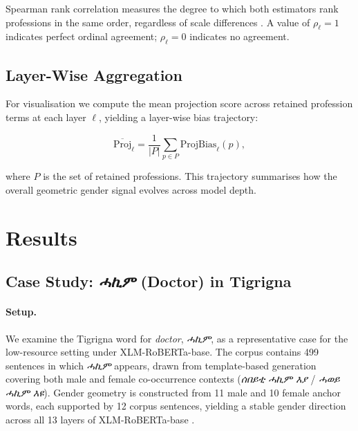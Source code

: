 \documentclass[10pt]{article}
\begin{document}
Spearman rank correlation measures the degree to which both estimators
rank professions in the same order, regardless of scale differences
\citep{spearman1904}. A value of $\rho_{\ell} = 1$ indicates perfect ordinal
agreement; $\rho_{\ell} = 0$ indicates no agreement.

\subsection{Layer-Wise Aggregation}

For visualisation we compute the mean projection score across retained
profession terms at each layer $\ell$, yielding a layer-wise bias trajectory:

\begin{equation}
  \overline{\mathrm{Proj}}_{\ell}
  =
  \frac{1}{|P|}
  \sum_{p \in P}
  \mathrm{ProjBias}_{\ell}(p),
\end{equation}

where $P$ is the set of retained professions. This trajectory summarises how
the overall geometric gender signal evolves across model depth.

\section{Results}

\subsection{Case Study: \textit{ሓኪም} (Doctor) in Tigrigna}
\label{sec:case-hakim}

\paragraph{Setup.}
We examine the Tigrigna word for \textit{doctor}, \textit{ሓኪም}, as a
representative case for the low-resource setting under XLM-RoBERTa-base.
The corpus contains 499 sentences in which \textit{ሓኪም} appears, drawn
from template-based generation covering both male and female co-occurrence
contexts (\textit{ሰበይቲ ሓኪም እያ} / \textit{ሓወይ ሓኪም እዩ}).
Gender geometry is constructed from 11 male and 10 female anchor words,
each supported by 12 corpus sentences, yielding a stable gender direction
across all 13 layers of XLM-RoBERTa-base \citep{conneau2020unsupervised}.
\end{document}
